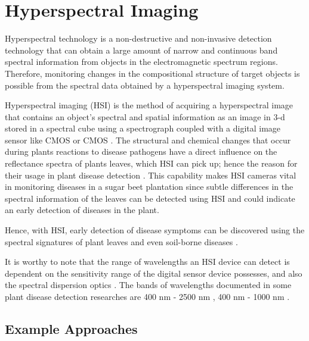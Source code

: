 \section{Hyperspectral Imaging}\label{hyperspectral}
Hyperspectral technology is a non-destructive and non-invasive detection technology that can obtain a large amount of narrow and continuous band spectral information from objects in the electromagnetic spectrum regions. Therefore, monitoring changes in the compositional structure of target objects is possible from the spectral data obtained by a hyperspectral imaging system.

Hyperspectral imaging (HSI) is the method of acquiring a hyperspectral image that contains an object’s spectral and spatial information as an image in 3-d stored in a spectral cube using a spectrograph coupled with a digital image sensor like CMOS or CMOS \cite{nguyen2021early, bock2010plant}. The structural and chemical changes that occur during plants reactions to disease pathogens have a direct influence on the reflectance spectra of plants leaves, which HSI can pick up; hence the reason for their usage in plant disease detection \cite{kuska2015proximal}. This capability makes HSI cameras vital in monitoring diseases in a sugar beet plantation since subtle differences in the spectral information of the leaves can be detected using HSI and could indicate an early detection of diseases in the plant.

Hence, with HSI, early detection of disease symptoms can be discovered using the spectral signatures of plant leaves and even soil-borne diseases \cite{kuska2015proximal, hillnhutter2010hyperspectral}. 

It is worthy to note that the range of wavelengths an HSI device can detect is dependent on the sensitivity range of the digital sensor device possesses, and also the spectral dispersion optics \cite{bock2010plant}. The bands of wavelengths documented in some plant disease detection researches are 400 nm - 2500 nm \cite{hillnhutter2011remote}, 400 nm - 1000 nm \cite{kuska2015proximal}.

\subsection*{Example Approaches}

